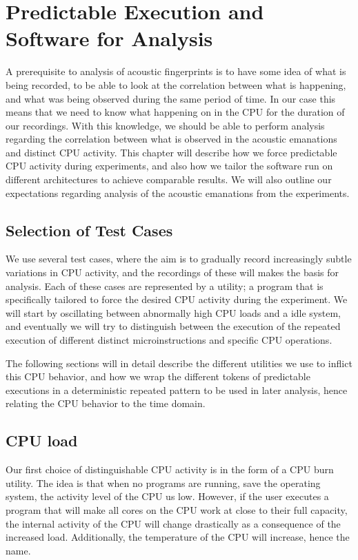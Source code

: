 \chapter{Predictable Execution and Software for Analysis}\label{chp4:predictable_execution} 
A prerequisite to analysis of acoustic fingerprints is to have some idea of what is being recorded, to be able to look at the correlation between what is happening, and what was being observed during the same period of time.
In our case this means that we need to know what happening on in the \gls{CPU} for the duration of our recordings.
With this knowledge, we should be able to perform analysis regarding the correlation between what is observed in the acoustic emanations and distinct \gls{CPU} activity.
This chapter will describe how we force predictable \gls{CPU} activity during experiments, and also how we tailor the software run on different architectures to achieve comparable results.
We will also outline our expectations regarding analysis of the acoustic emanations from the experiments.

\section{Selection of Test Cases}
We use several test cases, where the aim is to gradually record increasingly subtle variations in \gls{CPU} activity, and the recordings of these will makes the basis for analysis.
Each of these cases are represented by a utility; a program that is specifically tailored to force the desired \gls{CPU} activity during the experiment.
We will start by oscillating between abnormally high \gls{CPU} loads and a idle system, and eventually we will try to distinguish between the execution of the repeated execution of different distinct microinstructions and specific \gls{CPU} operations.

The following sections will in detail describe the different utilities we use to inflict this \gls{CPU} behavior, and how we wrap the different tokens of predictable executions in a deterministic repeated pattern to be used in later analysis, hence relating the \gls{CPU} behavior to the time domain.

\section{CPU load}\label{chp4:sec:cpu_load}
Our first choice of distinguishable \gls{CPU} activity is in the form of a \gls{CPU} burn utility. 
The idea is that when no programs are running, save the operating system, the activity level of the \gls{CPU} us low. 
However, if the user executes a program that will make all cores on the \gls{CPU} work at close to their full capacity, the internal activity of the \gls{CPU} will change drastically as a consequence of the increased load.
Additionally, the temperature of the \gls{CPU} will increase, hence the name.

